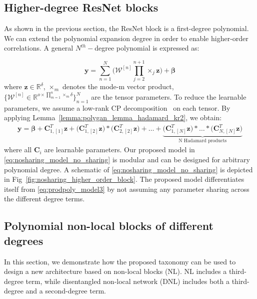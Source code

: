 \documentclass[runningheads]{llncs}
\newcommand{\resnet}{ResNet}
\newcommand{\realnum}{\mathbb{R}}
\providecommand{\bmcal}[1]{\bm{\mathcal{#1}}}
\providecommand{\invar}{z}
\providecommand{\binvar}{\bm{\invar}}
\begin{document}
\subsection{Higher-degree \resnet{} blocks}
\label{ssec:nosharing_pi_net_nosharing}
As shown in the previous section, the \resnet{} block is a first-degree polynomial. We can extend the polynomial expansion degree in order to enable higher-order correlations. 
A general $N^{th}-$degree polynomial is expressed as: 

\begin{equation}
    \bm{y} = \sum_{n=1}^N \bigg(\bmcal{W}^{[n]} \prod_{j=2}^{n+1} \times_{j} \binvar\bigg) + \bm{\beta}
    \label{eq:prodpoly_poly_general_eq}
\end{equation}
where $\binvar \in \realnum^{\delta}$, $\times_{m}$ denotes the mode-m vector product, $\big\{\bmcal{W}^{[n]} \in  \realnum^{o\times \prod_{m=1}^{n}\times_m \delta}\big\}_{n=1}^N$ are the tensor parameters. To reduce the learnable parameters, we assume a low-rank CP decomposition~\cite{kolda2009tensor} on each tensor. By applying Lemma~\ref{lemma:polygan_lemma_hadamard_kr2}, we obtain: 
\begin{equation}
\begin{split}
    \bm{y} = \bm{\beta} + \bm{C}_{1,[1]}^T \binvar + \Big(\bm{C}_{1,[2]}^T \binvar\Big) * \Big(\bm{C}_{2,[2]}^T \binvar\Big) + \ldots +  \underbrace{\Big(\bm{C}_{1,[N]}^T \binvar\Big) * \ldots * \Big(\bm{C}_{N,[N]}^T \binvar\Big)}_{\text{N Hadamard products}}
\end{split}
\label{eq:nosharing_model_no_sharing}
\end{equation}
where all $\bm{C}_i$ are learnable parameters. Our proposed model in \eqref{eq:nosharing_model_no_sharing} is modular and can be designed for arbitrary polynomial degree. A schematic of \eqref{eq:nosharing_model_no_sharing} is depicted in Fig~\ref{fig:nosharing_higher_order_block}. The proposed model differentiates itself from \eqref{eq:prodpoly_model3} by not assuming any parameter sharing across the different degree terms. 







\subsection{Polynomial non-local blocks of different degrees}
\label{ssec:nosharing_nonlocal_different_degrees}

In this section, we demonstrate how the proposed taxonomy can be used to design a new architecture based on non-local blocks (NL). 
NL includes a third-degree term, while disentangled non-local network (DNL) includes both a third-degree and a second-degree term. 
\end{document}
